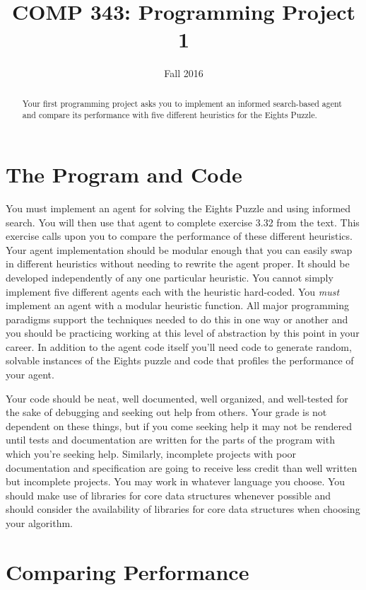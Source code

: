 \documentclass[nobib]{tufte-handout}
\title{COMP 343: Programming Project 1}
\author{  }
\date{Fall 2016}
\begin{document}
\maketitle

\begin{abstract}
Your first programming project asks you to implement an informed search-based agent and compare its performance with five different heuristics for the Eights Puzzle.
\end{abstract}

\section{The Program and Code}

You must implement an agent for solving the Eights Puzzle and using informed search. You will then use that agent to complete exercise 3.32 from the text. This exercise calls upon you to compare the performance of these different heuristics. Your agent implementation should be modular enough that you can easily swap in different heuristics without needing to rewrite the agent proper. It should be developed independently of any one particular heuristic. You cannot simply implement five different agents each with the heuristic hard-coded. You \textit{must} implement an agent with a modular heuristic function.  All major programming paradigms support the techniques needed to do this in one way or another and you should be practicing working at this level of abstraction by this point in your career. In addition to the agent code itself you'll need code to generate random, solvable instances of the Eights puzzle and code that profiles the performance of your agent.

Your code should be neat, well documented, well organized, and well-tested for the sake of debugging and seeking out help from others. Your grade is not dependent on these things, but if you come seeking help it may not be rendered until tests and documentation are written for the parts of the program with which you're seeking help. Similarly, incomplete projects with poor documentation and specification are going to receive less credit than well written but incomplete projects. You may work in whatever language you choose.  You should make use of libraries for core data structures whenever possible and should consider the availability of libraries for core data structures when choosing your algorithm.

\section{Comparing Performance}
\end{document}
